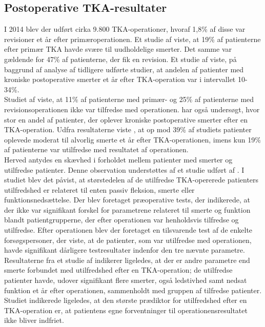 \subsection{Postoperative TKA-resultater} \label{patientermedsmerter}
I 2014 blev der udført cirka 9.800 TKA-operationer, hvoraf 1,8\% af disse var revisioner et år efter primæroperationen. \citep{aarsrapport2016} Et studie af  viste, at 19\% af patienterne efter primær TKA havde svære til uudholdelige smerter. Det samme var gældende for 47\% af patienterne, der fik en revision. Et studie af  viste, på baggrund af analyse af tidligere udførte studier, at andelen af patienter med kroniske postoperative smerter et år efter TKA-operation var i intervallet 10-34\%.\\
Studiet af  viste, at 11\% af patienterne med primær- og 25\% af patienterne med revisionsoperationen ikke var tilfredse med operationen. \citep{Petersen2015}
 har også undersøgt, hvor stor en andel af patienter, der oplever kroniske postoperative smerter efter en TKA-operation. Udfra resultaterne viste , at op mod 39\% af studiets patienter oplevede moderat til alvorlig smerte et år efter TKA-operationen, imens kun 19\% af patienterne var utilfredse med resultatet af operationen.\\
Herved antydes en skævhed i forholdet mellem patienter med smerter og utilfredse patienter. Denne observation understøttes af et studie udført af . I studiet blev det påvist, at størstedelen af de utilfredse TKA-opererede patienters utilfredshed er relateret til enten passiv fleksion, smerte eller funktionsnedsættelse. Der blev foretaget præoperative tests, der indikerede, at der ikke var signifikant forskel for parametrene relateret til smerte og funktion blandt patientgrupperne, der efter operationen var henholdsvis tilfredse og utilfredse. Efter operationen blev der foretaget en tilsvarende test af de enkelte forsøgspersoner, der viste, at de patienter, som var utilfredse med operationen, havde signifikant dårligere testresultater indenfor den tre nævnte parametre.  
Resultaterne fra et studie af  indikerer ligeledes, at der er andre parametre end smerte forbundet med utilfredshed efter en TKA-operation; de utilfredse patienter havde, udover signifikant flere smerter, også ledstivhed samt nedsat funktion et år efter operationen, sammenholdt med gruppen af tilfredse patienter. Studiet indikerede ligeledes, at den største prædiktor for utilfredshed efter en TKA-operation er, at patientens egne forventninger til operationensresultatet ikke bliver indfriet. 



